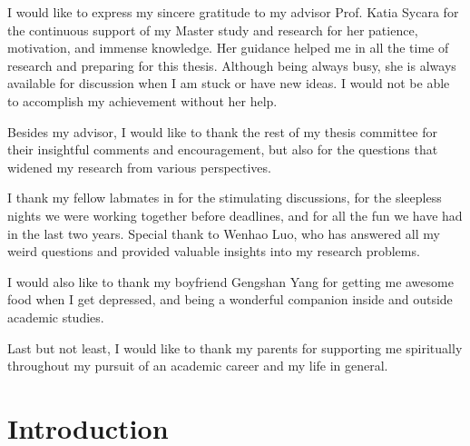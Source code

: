 \documentclass[12pt]{cmuthesis}
\theoremstyle{plain}
\begin{document}
\begin{acknowledgments}
I would like to express my sincere gratitude to my advisor Prof. Katia Sycara for the continuous support of my Master study and research for her patience, motivation, and immense knowledge. Her guidance helped me in all the time of research and preparing for this thesis. Although being always busy, she is always available for discussion when I am stuck or have new ideas. I would not be able to accomplish my achievement without her help.

Besides my advisor, I would like to thank the rest of my thesis committee for their insightful comments and encouragement, but also for the questions that widened my research from various perspectives.

I thank my fellow labmates in for the stimulating discussions, for the sleepless nights we were working together before deadlines, and for all the fun we have had in the last two years. Special thank to Wenhao Luo, who has answered all my weird questions and provided valuable insights into my research problems.

I would also like to thank my boyfriend Gengshan Yang for getting me awesome food when I get depressed, and being a wonderful companion inside and outside academic studies.

Last but not least, I would like to thank my parents for supporting me spiritually throughout my pursuit of an academic career and my life in general.
\end{acknowledgments}

\tableofcontents
\listoffigures

\mainmatter


%
%
%
%
%


\chapter{Introduction}

\end{document}
